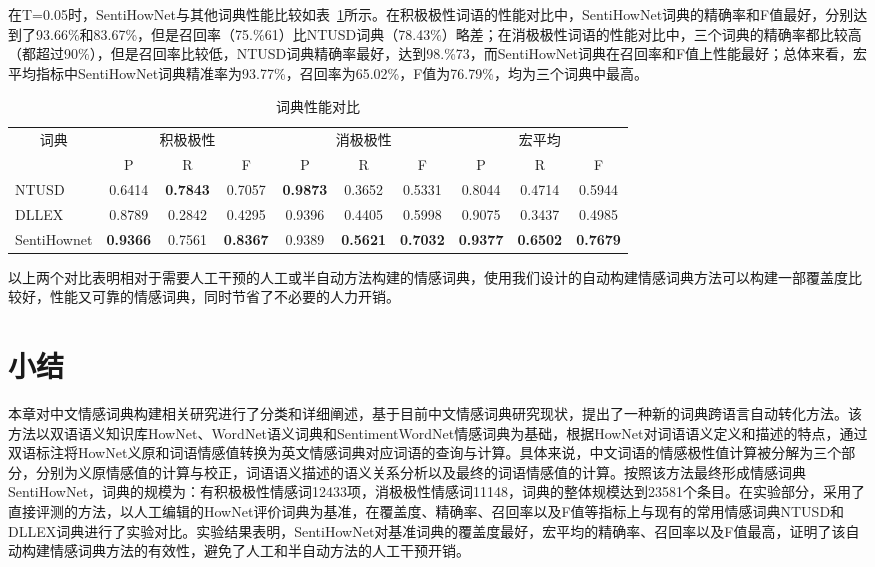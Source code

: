 在T=0.05时，SentiHowNet与其他词典性能比较如表~\ref{tab2-3}所示。在积极极性词语的性能对比中，SentiHowNet词典的精确率和F值最好，分别达到了93.66\%和83.67\%，但是召回率（75.\%61）比NTUSD词典（78.43\%）略差；在消极极性词语的性能对比中，三个词典的精确率都比较高（都超过90\%），但是召回率比较低，NTUSD词典精确率最好，达到98.\%73，而SentiHowNet词典在召回率和F值上性能最好；总体来看，宏平均指标中SentiHowNet词典精准率为93.77\%，召回率为65.02\%，F值为76.79\%，均为三个词典中最高。
\begin{table}[htp]
\centering
\caption{词典性能对比}
\label{tab2-3}
\begin{tabular}{|l|c|c|c|c|c|c|c|c|c|}
\hline
\multicolumn{1}{|c|}{\multirow{2}{*}{词典}} & \multicolumn{3}{c|}{积极极性} & \multicolumn{3}{c|}{消极极性} & \multicolumn{3}{c|}{宏平均} \\ \cline{2-10} 
\multicolumn{1}{|c|}{} & P & R & F & P & R & F & P & R & F \\ \hline
NTUSD & 0.6414 & \textbf{0.7843} & 0.7057 & \textbf{0.9873} & 0.3652 & 0.5331 & 0.8044 & 0.4714 & 0.5944 \\ \hline
DLLEX & 0.8789 & 0.2842 & 0.4295 & 0.9396 & 0.4405 & 0.5998 & 0.9075 & 0.3437 & 0.4985 \\ \hline
SentiHownet & \textbf{0.9366} & 0.7561 & \textbf{0.8367} & 0.9389 & \textbf{0.5621} & \textbf{0.7032} & \textbf{0.9377} & \textbf{0.6502} & \textbf{0.7679} \\ \hline
\end{tabular}
\end{table}

以上两个对比表明相对于需要人工干预的人工或半自动方法构建的情感词典，使用我们设计的自动构建情感词典方法可以构建一部覆盖度比较好，性能又可靠的情感词典，同时节省了不必要的人力开销。

\section{小结}
本章对中文情感词典构建相关研究进行了分类和详细阐述，基于目前中文情感词典研究现状，提出了一种新的词典跨语言自动转化方法。该方法以双语语义知识库HowNet、WordNet语义词典和SentimentWordNet情感词典为基础，根据HowNet对词语语义定义和描述的特点，通过双语标注将HowNet义原和词语情感值转换为英文情感词典对应词语的查询与计算。具体来说，中文词语的情感极性值计算被分解为三个部分，分别为义原情感值的计算与校正，词语语义描述的语义关系分析以及最终的词语情感值的计算。按照该方法最终形成情感词典SentiHowNet，词典的规模为：有积极极性情感词12433项，消极极性情感词11148，词典的整体规模达到23581个条目。在实验部分，采用了直接评测的方法，以人工编辑的HowNet评价词典为基准，在覆盖度、精确率、召回率以及F值等指标上与现有的常用情感词典NTUSD和DLLEX词典进行了实验对比。实验结果表明，SentiHowNet对基准词典的覆盖度最好，宏平均的精确率、召回率以及F值最高，证明了该自动构建情感词典方法的有效性，避免了人工和半自动方法的人工干预开销。